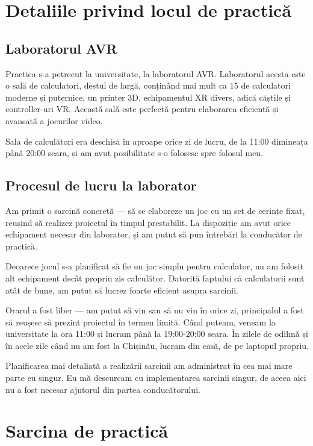 \documentclass[a4paper,12pt]{report}
\begin{document}
\chapter{Detaliile privind locul de practică}


\section{Laboratorul AVR}

Practica s-a petrecut la universitate, la laboratorul AVR.
Laboratorul acesta este o sală de calculatori, destul de largă, conținând mai mult ca 15 de calculatori moderne și puternice, un printer \ac{3D}, echipamentul \ac{XR} divers, adică căștile și controller-uri \ac{VR}.
Această sală este perfectă pentru elaborarea eficientă și avansată a jocurilor video.

Sala de calculători era deschisă în aproape orice zi de lucru, de la 11:00 dimineața până 20:00 seara, și am avut posibilitate s-o folosesc spre folosul meu.


\section{Procesul de lucru la laborator}

Am primit o sarcină concretă --- să se elaboreze un joc cu un set de cerințe fixat, reușind să realizez proiectul în timpul prestabilit.
La dispoziție am avut orice echipament necesar din laborator, și am putut să pun întrebări la conducător de practică.

Deoarece jocul s-a planificat să fie un joc simplu pentru calculator, nu am folosit alt echipament decât propriu zis calculător.
Datorită faptului că calculatorii sunt atât de bune, am putut să lucrez foarte eficient asupra sarcinii.

Orarul a fost liber --- am putut să vin sau să nu vin în orice zi, principalul a fost să reușesc să prezint proiectul în termen limită.
Când puteam, veneam la universitate la ora 11:00 și lucram până la 19:00-20:00 seara.
În zilele de odihnă și în acele zile când nu am fost la Chișinău, lucram din casă, de pe laptopul propriu.

Planificarea mai detaliată a realizării sarcinii am administrat în cea mai mare parte eu singur.
Eu mă descurcam cu implementarea sarcinii singur, de aceea aici nu a fost necesar ajutorul din partea conducătorului.


\chapter{Sarcina de practică}
\end{document}

